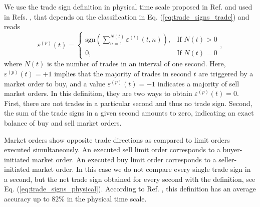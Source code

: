 We use the trade sign definition in physical time scale proposed in Ref.
\cite{Wang_2016_cross} and used in Refs.
\cite{Wang_2017,Wang_2016_avg}, that depends on the classification in
Eq. (\ref{eq:trade_signs_trade}) and reads
\begin{equation}\label{eq:trade_signs_physical}
    \varepsilon^{\left(p\right)}\left(t\right)=\left\{
    \begin{array}{cc}
    \text{sgn}\left(\sum_{n=1}^{N\left(t\right)}\varepsilon^{\left(t\right)}
    \left(t,n\right)\right),
    & \text{If }N \left(t\right)>0\\
    0, & \text{If }N\left(t\right)=0
    \end{array}\right. ,
\end{equation}
where $N \left(t \right)$ is the number of trades in an interval of one second.
Here, $\varepsilon^{\left(p\right)}\left( t \right) = +1$ implies that the
majority of trades in second $t$ are triggered by a market order to buy, and a
value $\varepsilon^{\left(p\right)}\left( t \right) = -1$ indicates a majority
of sell market orders. In this definition, they are two ways to obtain
$\varepsilon^{\left(p\right)}\left( t \right) = 0$. First, there are not trades
in a particular second and thus no trade sign. Second, the sum of the trade
signs in a given second amounts to zero, indicating an exact balance of buy and
sell market orders.

Market orders show opposite trade directions as compared to limit orders
executed simultaneously. An executed sell limit order corresponds to a
buyer-initiated market order. An executed buy limit order corresponds to a
seller-initiated market order. In this case we do not compare every single
trade sign in a second, but the net trade sign obtained for every second with
the definition, see Eq. (\ref{eq:trade_signs_physical}). According to Ref.
\cite{Wang_2016_cross}, this definition has an average accuracy up to $82\%$ in
the physical time scale.
